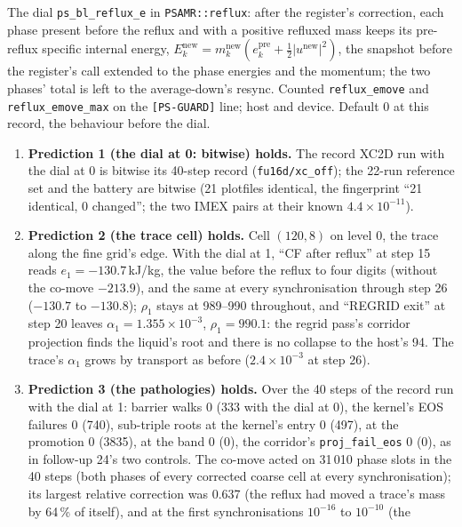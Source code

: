\documentclass[11pt,a4paper]{article}
\newcommand{\code}[1]{\texttt{\small #1}}
\begin{document}
The dial \code{ps\_bl\_reflux\_e} in \code{PSAMR::reflux}: after the
register's correction, each phase present before the reflux and with
a positive refluxed mass keeps its pre-reflux specific internal energy,
$E_k^{\mathrm{new}} = m_k^{\mathrm{new}} (e_k^{\mathrm{pre}} + \tfrac12
|u^{\mathrm{new}}|^2)$, the snapshot before the register's call
extended to the phase energies and the momentum; the two phases'
total is left to the average-down's resync.  Counted
\code{reflux\_emove} and \code{reflux\_emove\_max} on the
\code{[PS-GUARD]} line; host and device.  Default 0 at this record,
the behaviour before the dial.
\begin{enumerate}[nosep]
\item \textbf{Prediction 1 (the dial at 0: bitwise) holds.}  The
      record XC2D run with the dial at 0 is bitwise its 40-step record
      (\code{fu16d/xc\_off}); the 22-run reference set and the
      battery are bitwise (21 plotfiles identical, the fingerprint ``21
      identical, 0 changed''; the two IMEX pairs at their known
      $4.4\times10^{-11}$).
\item \textbf{Prediction 2 (the trace cell) holds.}  Cell $(120, 8)$
      on level 0, the trace along the fine grid's edge.  With the dial
      at 1, ``CF after reflux'' at step 15 reads $e_1 = -130.7$\,kJ/kg,
      the value before the reflux to four digits (without the co-move
      $-213.9$), and the same at every synchronisation through step 26
      ($-130.7$ to $-130.8$); $\rho_1$ stays at 989--990 throughout, and
      ``REGRID exit'' at step 20 leaves $\alpha_1 = 1.355\times10^{-3}$,
      $\rho_1 = 990.1$: the regrid pass's corridor projection finds the
      liquid's root and there is no collapse to the host's 94.  The
      trace's $\alpha_1$ grows by transport as before ($2.4\times10^{-3}$
      at step 26).
\item \textbf{Prediction 3 (the pathologies) holds.}  Over the 40 steps
      of the record run with the dial at 1: barrier walks 0 (333 with
      the dial at 0), the kernel's EOS failures 0 (740), sub-triple
      roots at the kernel's entry 0 (497), at the promotion 0 (3835), at
      the band 0 (0), the corridor's \code{proj\_fail\_eos} 0 (0), as in
      follow-up 24's two controls.  The co-move acted on 31\,010 phase
      slots in the 40 steps (both phases of every corrected coarse cell
      at every synchronisation); its largest relative correction was
      0.637 (the reflux had moved a trace's mass by 64\,\% of itself),
      and at the first synchronisations $10^{-16}$ to $10^{-10}$ (the

\end{enumerate}
\end{document}
